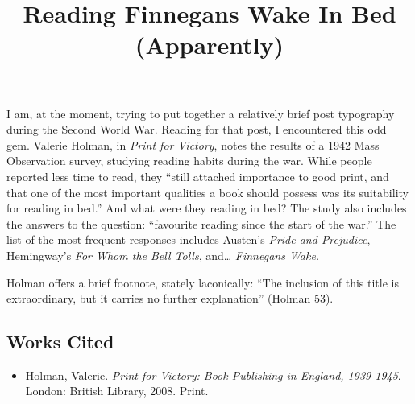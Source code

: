 \documentclass[
  12pt,
]{article}
\title{Reading Finnegans Wake In Bed (Apparently)}
\author{}
\date{}
\providecommand{\tightlist}{%
  \setlength{\itemsep}{0pt}\setlength{\parskip}{0pt}}
\begin{document}
I am, at the moment, trying to put together a relatively brief post
typography during the Second World War. Reading for that post, I
encountered this odd gem. Valerie Holman, in \emph{Print for Victory},
notes the results of a 1942 Mass Observation survey, studying reading
habits during the war. While people reported less time to read, they
``still attached importance to good print, and that one of the most
important qualities a book should possess was its suitability for
reading in bed.'' And what were they reading in bed? The study also
includes the answers to the question: ``favourite reading since the
start of the war.'' The list of the most frequent responses includes
Austen's \emph{Pride and Prejudice}, Hemingway's \emph{For Whom the Bell
Tolls}, and\ldots{} \emph{Finnegans Wake.}

Holman offers a brief footnote, stately laconically: ``The inclusion of
this title is extraordinary, but it carries no further explanation''
(Holman 53).

\hypertarget{works-cited}{%
\subsection{Works Cited}\label{works-cited}}

\begin{itemize}
\tightlist
\item
  Holman, Valerie. \emph{Print for Victory: Book Publishing in England,
  1939-1945}. London: British Library, 2008. Print.
\end{itemize}
\end{document}
